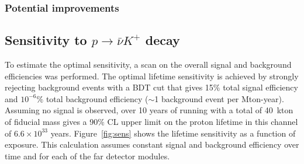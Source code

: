 \subsubsection{Potential improvements}



\subsection{Sensitivity to $p\to\bar{\nu}K^+$ decay}
\label{subsec:nonaccel-ndk-nubarkplus}

To estimate the optimal sensitivity, a scan on the overall signal and background efficiencies was performed.  The optimal lifetime sensitivity is achieved by strongly rejecting background events with a BDT cut that gives 15$\%$ total signal efficiency and $10^{-6}\%$ total background efficiency ($\sim$1 background event per Mton-year). Assuming no signal is observed, over 10 years of running with a total of 40~kton of fiducial mass gives a 90$\%$ CL upper limit on the proton lifetime in this channel of $6.6\times10^{33}$ years. Figure~\ref{fig:sens} shows the lifetime sensitivity as a function of exposure. This calculation assumes constant signal and background efficiency over time and for each of the far detector modules. 

